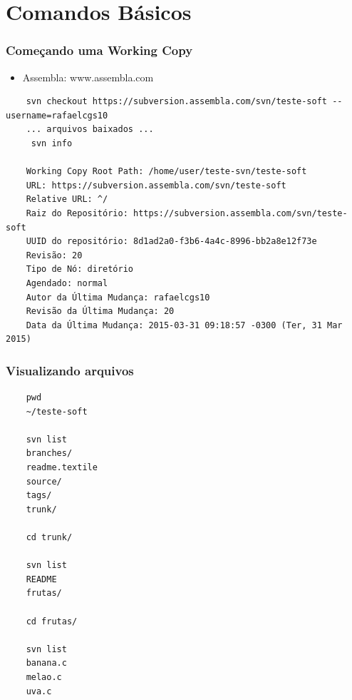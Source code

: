 \documentclass{beamer}
\begin{document}
\section{Comandos B\'asicos}

\begin{frame}[fragile]
    \frametitle{Come\c{c}ando uma Working Copy}
    \begin{itemize}
        \item Assembla: www.assembla.com
    \end{itemize}


    \begin{bash}{}
        {\tiny
    \begin{verbatim}
    svn checkout https://subversion.assembla.com/svn/teste-soft --username=rafaelcgs10
    ... arquivos baixados ...
     svn info

    Working Copy Root Path: /home/user/teste-svn/teste-soft
    URL: https://subversion.assembla.com/svn/teste-soft
    Relative URL: ^/
    Raiz do Repositório: https://subversion.assembla.com/svn/teste-soft
    UUID do repositório: 8d1ad2a0-f3b6-4a4c-8996-bb2a8e12f73e
    Revisão: 20
    Tipo de Nó: diretório
    Agendado: normal
    Autor da Última Mudança: rafaelcgs10
    Revisão da Última Mudança: 20
    Data da Última Mudança: 2015-03-31 09:18:57 -0300 (Ter, 31 Mar 2015)
    \end{verbatim}
    }
    \end{bash}

\end{frame}

\begin{frame}[fragile]
    \frametitle{Visualizando arquivos}

    \begin{bash}{}
    {\tiny
    \begin{verbatim}
    pwd
    ~/teste-soft

    svn list
    branches/
    readme.textile
    source/
    tags/
    trunk/

    cd trunk/

    svn list
    README
    frutas/

    cd frutas/

    svn list
    banana.c
    melao.c
    uva.c
    \end{verbatim}
    }
    \end{bash}

\end{frame}
\end{document}
